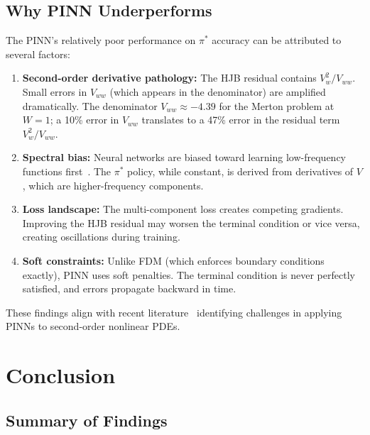 \documentclass[12pt,a4paper]{article}
\begin{document}
\subsection{Why PINN Underperforms}

The PINN's relatively poor performance on $\pi^*$ accuracy can be attributed to several factors:

\begin{enumerate}
    \item \textbf{Second-order derivative pathology:} The HJB residual contains $V_w^2 / V_{ww}$. Small errors in $V_{ww}$ (which appears in the denominator) are amplified dramatically. The denominator $V_{ww} \approx -4.39$ for the Merton problem at $W=1$; a 10\% error in $V_{ww}$ translates to a 47\% error in the residual term $V_w^2 / V_{ww}$.
    
    \item \textbf{Spectral bias:} Neural networks are biased toward learning low-frequency functions first~\cite{wang2022}. The $\pi^*$ policy, while constant, is derived from derivatives of $V$, which are higher-frequency components.
    
    \item \textbf{Loss landscape:} The multi-component loss creates competing gradients. Improving the HJB residual may worsen the terminal condition or vice versa, creating oscillations during training.
    
    \item \textbf{Soft constraints:} Unlike FDM (which enforces boundary conditions exactly), PINN uses soft penalties. The terminal condition is never perfectly satisfied, and errors propagate backward in time.
\end{enumerate}

These findings align with recent literature~\cite{wang2022,elfers2021} identifying challenges in applying PINNs to second-order nonlinear PDEs.

\section{Conclusion}
\label{sec:conclusion}

\subsection{Summary of Findings}
\end{document}
